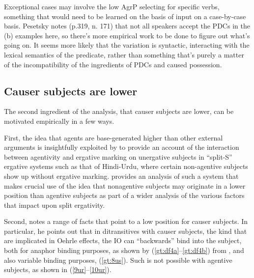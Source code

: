 \documentclass[output=paper,colorlinks,citecolor=brown]{langscibook}
\begin{document}

\noindent Exceptional cases may involve the low AgrP selecting for specific verbs, something that would need to be learned on the basis of input on a case-by-case basis. Pesetsky notes (p.319, n. 171) that not all speakers accept the PDCs in the (b) examples here, so there's more empirical work to be done to figure out what's going on. It seems more likely that the variation is syntactic, interacting with the lexical semantics of the predicate, rather than something that's purely a matter of the incompatibility of the ingredients of PDCs and caused possession. 

\subsection{Causer subjects are lower}\label{gt:fdr}

The second ingredient of the analysis, that causer subjects are lower, can be motivated empirically in a few ways. 

First, the idea that agents are base-generated higher than other external arguments is insightfully exploited by \citet{gt:Bjorkman:2018} to provide an account of the interaction between agentivity and ergative marking on unergative subjects in ``split-S'' ergative systems such as that of Hindi-Urdu, where certain non-agentive subjects show up without ergative marking. \citet[343]{gt:Bjorkman:2018} provides an analysis of such a system that makes crucial use of the idea that nonagentive subjects may originate in a lower position than agentive subjects as part of a wider analysis of the various factors that impact upon split ergativity. 

Second, \citet{gt:Pesetsky:1995} notes a range of facts that point to a low position for causer subjects. In particular, he points out that in ditransitives with causer subjects, the kind that are implicated in Oehrle effects, the IO can ``backwards'' bind into the subject, both for anaphor binding purposes, as shown by (\ref{gt:df4a}--\ref{gt:df4b}) from \citet[201]{gt:Pesetsky:1995}, and also variable binding purposes, (\ref{gt:8us}). Such  is not possible with agentive subjects, as shown in (\ref{9ur}--\ref{10ur}). 
\end{document}
